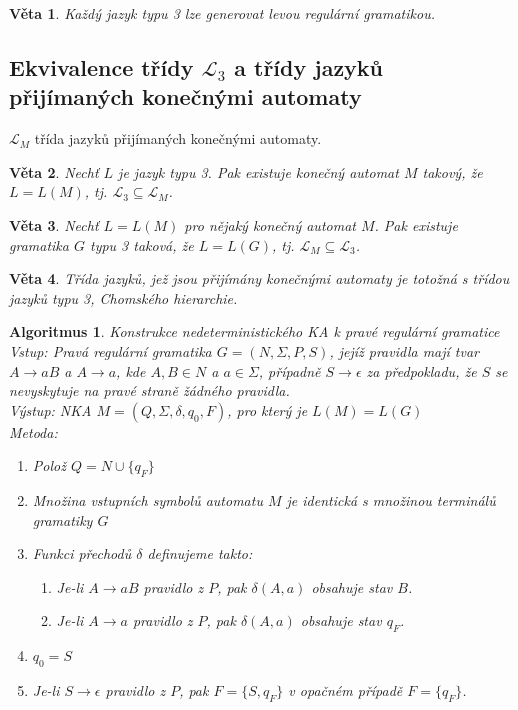 \documentclass[a4paper, 11pt]{report}
\newtheorem{veta}{Věta}[chapter]
\newtheorem{alg}{Algoritmus}[chapter]
\begin{document}
\begin{veta}
Každý jazyk typu 3 lze generovat levou regulární gramatikou.
\end{veta}

\subsection{Ekvivalence třídy $\mathcal{L}_3$ a třídy jazyků přijímaných konečnými automaty}

$\mathcal{L}_M$ třída jazyků přijímaných konečnými automaty.

\begin{veta}
Nechť $L$ je jazyk typu 3. Pak existuje konečný automat $M$ takový, že $L = L(M)$, tj. $\mathcal{L}_3 \subseteq \mathcal{L}_M$.
\end{veta}

\begin{veta}
Nechť $L = L(M)$ pro nějaký konečný automat $M$. Pak existuje gramatika $G$ typu 3 taková, že $L = L(G)$, tj. $\mathcal{L}_M \subseteq \mathcal{L}_3$.
\end{veta}

\begin{veta}
Třída jazyků, jež jsou přijímány konečnými automaty je totožná s třídou jazyků typu 3, Chomského hierarchie.
\end{veta}

\begin{alg}
Konstrukce nedeterministického KA k pravé regulární gramatice\\
Vstup: Pravá regulární gramatika  $G = (N, \Sigma, P, S)$, jejíž pravidla mají tvar $A \to aB$ a $A \to a$, kde $A,B \in N$ a $a \in \Sigma$, případně $S \to \epsilon$ za předpokladu, že $S$ se nevyskytuje na pravé straně žádného pravidla.\\
Výstup: NKA $M = (Q, \Sigma, \delta, q_0, F)$, pro který je $L(M) = L(G)$\\
Metoda:
\begin{enumerate}
	\item Polož $Q = N \cup \{q_F\}$
	\item Množina vstupních symbolů automatu $M$ je identická s množinou terminálů gramatiky $G$
	\item Funkci přechodů $\delta$ definujeme takto:
	\begin{enumerate}
		\item Je-li $A \to aB$ pravidlo z $P$, pak $\delta(A, a)$ obsahuje stav $B$.
		\item Je-li $A \to a$ pravidlo z $P$, pak $\delta(A, a)$ obsahuje stav $q_F$.
	\end{enumerate}
	\item $q_0 = S$
	\item Je-li $S \to \epsilon$ pravidlo z $P$, pak $F = \{S, q_F\}$ v opačném případě $F = \{q_F\}$.
\end{enumerate}
\end{alg}
\end{document}
